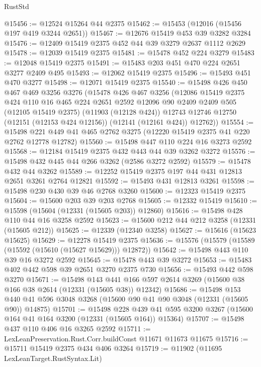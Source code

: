 \begin{lexlean}{RustStd}
\begin{coremodule}
@15456 := @12524 @15264 @44 @2375
@15462 := @15453 (@12016 (@15456 @197 @419 @3244 @2651))
@15467 := @12676 @15419 @453 @39 @3282 @3284
@15476 := @12409 @15419 @2375 @452 @44 @39 @3279 @2637 @1112 @2629
@15478 := @12039 @15419 @2375
@15481 := @15478 @452 @224 @3279
@15483 := @12048 @15419 @2375
@15491 := @15483 @203 @451 @470 @224 @2651 @3277 @2409 @495
@15493 := @12062 @15419 @2375
@15496 := @15493 @451 @470 @3277
@15498 := @12071 @15419 @2375
@15540 := @15498
    @426
    @450
    @467
    @469
    @3256
    @3276
    (@15478
      @426
      @467
      @3256
      (@12086
        @15419
        @2375
        @424
        @110
        @16
        @465
        @224
        @2651
        @2592
        @12096
        @90
        @2409
        @2409
        @505
        (@12105 @15419 @2375)
        (@11903 (@12128 @424))
        @12743
        @12746
        @12750
        (@12151 (@12153 @424 @12156))
        (@12141 (@12161 @424))
        @12762))
@15554 := @15498 @221 @449 @41 @465 @2762 @3275 (@12220 @15419 @2375 @41 @220 @2762 @12778 @12782)
@15560 := @15498 @447 @110 @224 @16 @3273 @2592
@15568 := @12184 @15419 @2375 @432 @443 @44 @39 @3262 @3272
@15576 := @15498 @432 @445 @44 @266 @3262 (@2586 @3272 @2592)
@15579 := @15478 @432 @44 @3262
@15589 := @12252 @15419 @2375 @197 @44 @431 @12813 @2651 @3261 @2764 @12821
@15592 := @15493 @431 @12813 @3261
@15598 := @15498 @230 @430 @39 @46 @2768 @3260
@15600 := @12323 @15419 @2375
@15604 := @15600 @203 @39 @203 @2768
@15605 := @12332 @15419
@15610 := @15598 (@15604 (@12331 (@15605 @203)) @12860)
@15616 := @15498 @428 @110 @44 @16 @3258 @2592
@15623 := @15600 @212 @44 @212 @3258 (@12331 (@15605 @212))
@15625 := @12339 (@12340 @3258)
@15627 := @15616 (@15623 @15625)
@15629 := @12278 @15419 @2375
@15636 := @15576 (@15579 (@15589 (@15592 (@15610 (@15627 @15629))) @12872))
@15642 := @15498 @443 @110 @39 @16 @3272 @2592
@15645 := @15478 @443 @39 @3272
@15653 := @15483 @402 @442 @598 @39 @2651 @3270 @2375 @730
@15656 := @15493 @442 @598 @3270
@15671 := @15498
    @143
    @441
    @166
    @597
    @2614
    @3269
    (@15600 @38 @166 @38 @2614 (@12331 (@15605 @38)) @12342)
@15686 := @15498
    @153
    @440
    @41
    @596
    @3048
    @3268
    (@15600 @90 @41 @90 @3048 (@12331 (@15605 @90)) @14875)
@15701 := @15498
    @228
    @439
    @41
    @595
    @3200
    @3267
    (@15600 @164 @41 @164 @3200 (@12331 (@15605 @164)) @15364)
@15707 := @15498 @437 @110 @406 @16 @3265 @2592
@15711 := LexLeanPreservation.Rust.Corr.buildConst @11671 @11673 @11675
@15716 := @15711 @15419 @2375 @434 @406 @3264
@15719 := @11902 (@11695 LexLeanTarget.RustSyntax.Lit)

\end{coremodule}
\end{lexlean}
